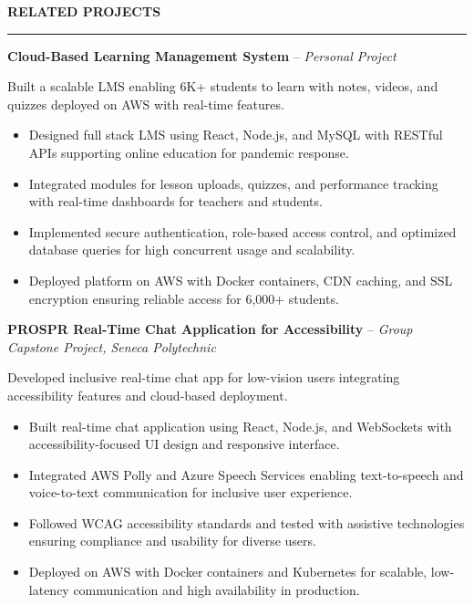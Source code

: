 \documentclass[10pt,letterpaper]{article}
\begin{document}
\vspace{6pt}

\textbf{RELATED PROJECTS}\\[-8pt]
\noindent\rule{\textwidth}{1pt}

\vspace{-2pt}

\textbf{Cloud-Based Learning Management System} -- \emph{Personal Project}

\vspace{-1pt}

Built a scalable LMS enabling 6K+ students to learn with notes, videos, and quizzes deployed on AWS with real-time features.
\vspace{-1pt}
\begin{itemize}
\item Designed full stack LMS using React, Node.js, and MySQL with RESTful APIs supporting online education for pandemic response.
\item Integrated modules for lesson uploads, quizzes, and performance tracking with real-time dashboards for teachers and students.
\item Implemented secure authentication, role-based access control, and optimized database queries for high concurrent usage and scalability.
\item Deployed platform on AWS with Docker containers, CDN caching, and SSL encryption ensuring reliable access for 6,000+ students.
\end{itemize}

\textbf{PROSPR  Real-Time Chat Application for Accessibility} -- \emph{Group Capstone Project, Seneca Polytechnic }

\vspace{-1pt}

Developed inclusive real-time chat app for low-vision users integrating accessibility features and cloud-based deployment.
\vspace{-1pt}
\begin{itemize}
\item Built real-time chat application using React, Node.js, and WebSockets with accessibility-focused UI design and responsive interface.
\item Integrated AWS Polly and Azure Speech Services enabling text-to-speech and voice-to-text communication for inclusive user experience.
\item Followed WCAG accessibility standards and tested with assistive technologies ensuring compliance and usability for diverse users.
\item Deployed on AWS with Docker containers and Kubernetes for scalable, low-latency communication and high availability in production.
\end{itemize}
\end{document}
